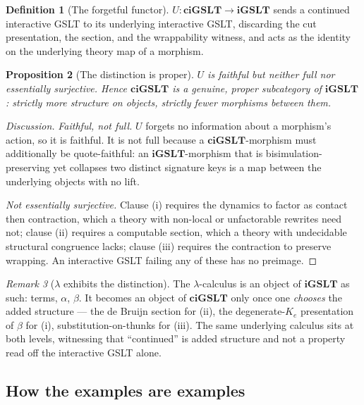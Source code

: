 \documentclass[11pt]{article}
\theoremstyle{definition}
\newtheorem{definition}{Definition}[section]
\theoremstyle{plain}
\newtheorem{proposition}[definition]{Proposition}
\theoremstyle{remark}
\newtheorem{remark}[definition]{Remark}
\newcommand{\iGSLT}{\mathbf{iGSLT}}
\newcommand{\ciGSLT}{\mathbf{ciGSLT}}
\begin{document}
\begin{definition}[The forgetful functor]
$U : \ciGSLT \to \iGSLT$ sends a continued interactive GSLT to its underlying interactive
GSLT, discarding the cut presentation, the section, and the wrappability witness, and
acts as the identity on the underlying theory map of a morphism.
\end{definition}

\begin{proposition}[The distinction is proper]
\label{prop:proper}
$U$ is faithful but neither full nor essentially surjective. Hence $\ciGSLT$ is a
genuine, proper subcategory of $\iGSLT$: strictly more structure on objects, strictly
fewer morphisms between them.
\end{proposition}

\begin{proof}[Discussion]
\emph{Faithful, not full.} $U$ forgets no information about a morphism's action, so it
is faithful. It is not full because a $\ciGSLT$-morphism must additionally be
quote-faithful: an $\iGSLT$-morphism that is bisimulation-preserving yet collapses two
distinct signature keys is a map between the underlying objects with no lift.

\emph{Not essentially surjective.} Clause (i) requires the dynamics to factor as contact
then contraction, which a theory with non-local or unfactorable rewrites need not;
clause (ii) requires a computable section, which a theory with undecidable structural
congruence lacks; clause (iii) requires the contraction to preserve wrapping. An
interactive GSLT failing any of these has no preimage.
\end{proof}

\begin{remark}[$\lambda$ exhibits the distinction]
The $\lambda$-calculus is an object of $\iGSLT$ as such: terms, $\alpha$, $\beta$. It
becomes an object of $\ciGSLT$ only once one \emph{chooses} the added structure --- the
de Bruijn section for (ii), the degenerate-$K_e$ presentation of $\beta$ for (i),
substitution-on-thunks for (iii). The same underlying calculus sits at both levels,
witnessing that ``continued'' is added structure and not a property read off the
interactive GSLT alone.
\end{remark}

\subsection{How the examples are examples}
\label{subsec:table}
\end{document}
